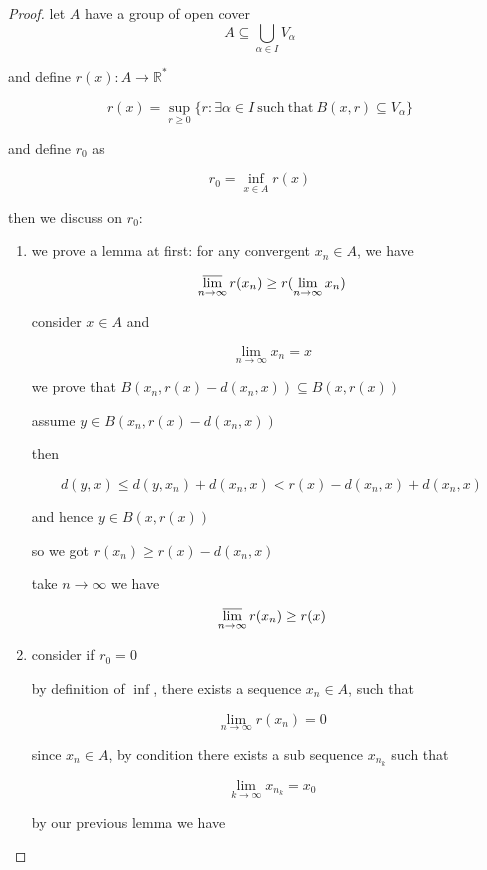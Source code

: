 \begin{proof}
    let $A$ have a group of open cover
    \[
        A \subseteq \bigcup_{\alpha \in I}V_{\alpha}
    \]

    and define $r(x): A \to \mathbb{R}^*$

    \[
        r(x) = \sup_{r \ge 0} \{ r: \exists \alpha \in I \mathrm{\: such \: that \:} B(x,r) \subseteq V_{\alpha} \}
    \]

    and define $r_0$ as

    \[
        r_0 = \inf_{x \in A} r(x)
    \]

    then we discuss on $r_0$:

    \begin{enumerate}
        \item we prove a lemma at first: for any convergent $x_n \in A$, we have

        \[
            \varlimsup_{n \to \infty}r(x_n) \ge r(\lim_{n \to \infty}x_n)
        \]

        consider $x \in A$ and

        \[
            \lim_{n \to \infty}x_n = x
        \]

        we prove that $B(x_n, r(x) -d(x_n,x)) \subseteq B(x,r(x))$

        assume $y \in B(x_n, r(x) -d(x_n,x))$

        then

        \[
            d(y,x) \le d(y,x_n) + d(x_n,x) < r(x) -d(x_n,x) +d(x_n,x) 
        \]

        and hence $y \in B(x,r(x))$

        so we got $r(x_n) \ge r(x) - d(x_n,x)$

        take $n \to \infty$ we have

        \[
            \varlimsup_{n \to \infty}r(x_n) \ge r(x)
        \]


        \item consider if $r_0 = 0$

        by definition of $\inf$, there exists a sequence $x_n \in A$, such that

        \[
            \lim_{n \to \infty}r(x_n) = 0
        \]

        since $x_n \in A$, by condition there exists a sub sequence $x_{n_k}$ such that

        \[
            \lim_{k \to \infty}x_{n_{k}} = x_0 
        \]

        by our previous lemma we have


\end{enumerate}
\end{proof}
